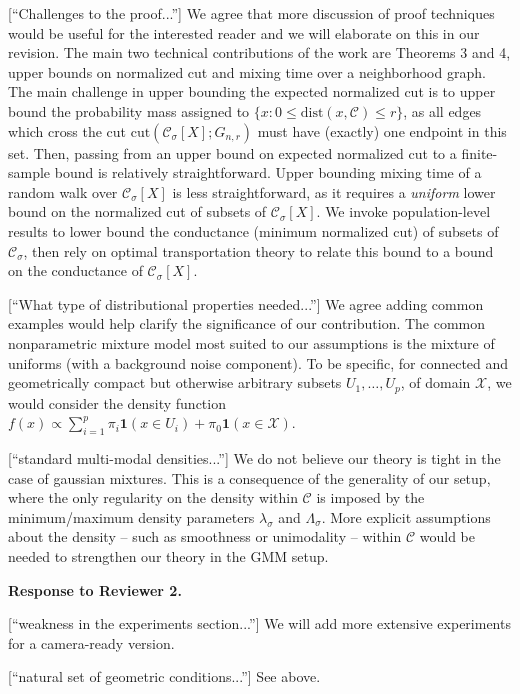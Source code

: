 \documentclass{article}
\begin{document}
[``Challenges to the proof...''] We agree that more discussion of proof techniques would be useful for the interested reader and we will elaborate on this in our revision. The main two technical contributions of the work are Theorems 3 and 4, upper bounds on normalized cut and mixing time over a neighborhood graph. The main challenge in upper bounding the expected normalized cut is to upper bound the probability mass assigned to $\{x: 0 \leq \mathrm{dist}(x,\mathcal{C}) \leq r\}$, as all edges which cross the cut $\mathrm{cut}(\mathcal{C}_{\sigma}[X]; G_{n,r})$ must have (exactly) one endpoint in this set. Then, passing from an upper bound on expected normalized cut to a finite-sample bound is relatively straightforward. Upper bounding mixing time of a random walk over $\mathcal{C}_{\sigma}[X]$ is less straightforward, as it requires a \textit{uniform} lower bound on the normalized cut of subsets of $\mathcal{C}_{\sigma}[X]$. We invoke population-level results to lower bound the conductance (minimum normalized cut) of subsets of $\mathcal{C}_{\sigma}$, then rely on optimal transportation theory to relate this bound to a bound on the conductance of $\mathcal{C}_{\sigma}[X]$.

[``What type of distributional properties needed...''] We agree adding common examples would help clarify the significance of our contribution. The common nonparametric mixture model most suited to our assumptions is the mixture of uniforms (with a background noise component). To be specific, for connected and geometrically compact but otherwise arbitrary subsets $U_1, \ldots, U_p$,  of domain $\mathcal{X}$, we would consider the density function $f(x) \propto \sum_{i = 1}^{p} \pi_i \mathbf{1}(x \in U_i) + \pi_0 \mathbf{1}(x \in \mathcal{X})$. 

[``standard multi-modal densities...''] We do not believe our theory is tight in the case of gaussian mixtures. This is a consequence of the generality of our setup, where the only regularity on the density within $\mathcal{C}$ is imposed by the minimum/maximum density parameters $\lambda_{\sigma}$ and $\Lambda_{\sigma}$. More explicit assumptions about the density -- such as smoothness or unimodality -- within $\mathcal{C}$ would be needed to strengthen our theory in the GMM setup. 

\textbf{Response to Reviewer 2.}

[``weakness in the experiments section...''] We will add more extensive experiments for a camera-ready version.

[``natural set of geometric conditions...''] See above.
\end{document}
